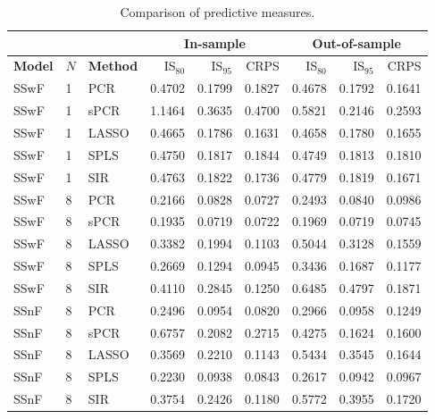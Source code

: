 \documentclass[11pt]{amsart}
\theoremstyle{plain}
\theoremstyle{definition}
\theoremstyle{remark}
\begin{document}
\begin{table}
  \centering
  \begin{tabular}{lll|rrr|rrr}
    \toprule
    \multicolumn{3}{c}{} & \multicolumn{3}{|c}{In-sample}  & \multicolumn{3}{|c}{Out-of-sample} \\
    \midrule
    \textbf{Model} & $N$ & \textbf{Method} & IS$_{80}$ & IS$_{95}$ & CRPS & IS$_{80}$ & IS$_{95}$ & CRPS \\
    \midrule
   SSwF & 1 & PCR & 0.4702 & 0.1799 & 0.1827 & 0.4678 & 0.1792 & 0.1641 \\ 
   SSwF & 1 & sPCR & 1.1464 & 0.3635 & 0.4700 & 0.5821 & 0.2146 & 0.2593 \\ 
   SSwF & 1 & LASSO & 0.4665 & 0.1786 & 0.1631 & 0.4658 & 0.1780 & 0.1655 \\ 
   SSwF & 1 & SPLS & 0.4750 & 0.1817 & 0.1844 & 0.4749 & 0.1813 & 0.1810 \\ 
   SSwF & 1 & SIR & 0.4763 & 0.1822 & 0.1736 & 0.4779 & 0.1819 & 0.1671 \\
   \midrule
   SSwF & 8 & PCR & 0.2166 & 0.0828 & 0.0727 & 0.2493 & 0.0840 & 0.0986 \\ 
   SSwF & 8 & sPCR & 0.1935 & 0.0719 & 0.0722 & 0.1969 & 0.0719 & 0.0745 \\ 
   SSwF & 8 & LASSO & 0.3382 & 0.1994 & 0.1103 & 0.5044 & 0.3128 & 0.1559 \\ 
   SSwF & 8 & SPLS & 0.2669 & 0.1294 & 0.0945 & 0.3436 & 0.1687 & 0.1177 \\ 
   SSwF & 8 & SIR & 0.4110 & 0.2845 & 0.1250 & 0.6485 & 0.4797 & 0.1871 \\
   \midrule 
   SSnF & 8 & PCR & 0.2496 & 0.0954 & 0.0820 & 0.2966 & 0.0958 & 0.1249 \\ 
   SSnF & 8 & sPCR & 0.6757 & 0.2082 & 0.2715 & 0.4275 & 0.1624 & 0.1600 \\ 
   SSnF & 8 & LASSO & 0.3569 & 0.2210 & 0.1143 & 0.5434 & 0.3545 & 0.1644 \\ 
   SSnF & 8 & SPLS & 0.2230 & 0.0938 & 0.0843 & 0.2617 & 0.0942 & 0.0967 \\ 
   SSnF & 8 & SIR & 0.3754 & 0.2426 & 0.1180 & 0.5772 & 0.3955 & 0.1720 \\
   \bottomrule
\end{tabular}
  \caption{Comparison of predictive measures.}
  \label{tab:comparisontot}
\end{table}
\end{document}
